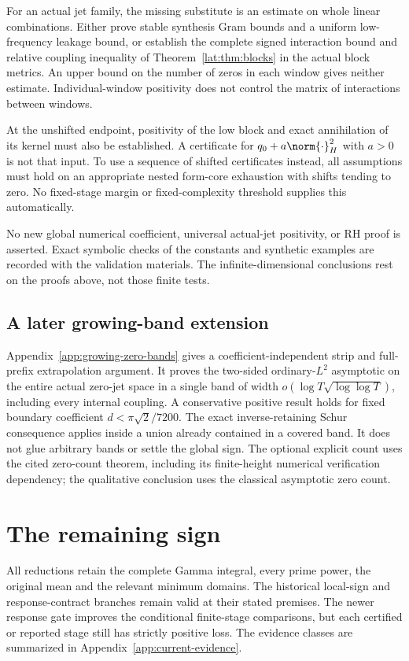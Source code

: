 \documentclass[11pt,a4paper]{article}
\numberwithin{equation}{section}
\theoremstyle{definition}\newtheorem{definition}[theorem]{Definition}
\theoremstyle{remark}\newtheorem{remark}[theorem]{Remark}
\begin{document}
For an actual jet family, the missing substitute is an estimate on whole
linear combinations. Either prove stable synthesis Gram bounds and a
uniform low-frequency leakage bound, or establish the complete signed
interaction bound and relative coupling inequality of
Theorem~\ref{lat:thm:blocks} in the actual block metrics. An upper bound on the
number of zeros in each window gives neither estimate. Individual-window
positivity does not control the matrix of interactions between windows.

At the unshifted endpoint, positivity of the low block and exact
annihilation of its kernel must also be established. A certificate for
$q_0+a\norm{\cdot}_H^2$ with $a>0$ is not that input. To use a sequence of
shifted certificates instead, all assumptions must hold on an appropriate
nested form-core exhaustion with shifts tending to zero. No fixed-stage
margin or fixed-complexity threshold supplies this automatically.

No new global numerical coefficient, universal actual-jet positivity,
or RH proof is asserted. Exact symbolic checks of the constants and synthetic examples are recorded with the validation materials. The infinite-dimensional conclusions rest on the proofs above, not those finite tests.


\subsection{A later growing-band extension}
Appendix~\ref{app:growing-zero-bands} gives a coefficient-independent
strip and full-prefix extrapolation argument. It proves the two-sided
ordinary-$L^2$ asymptotic on the entire actual zero-jet space in a single
band of width $o(\log T\sqrt{\log\log T})$, including every internal
coupling. A conservative positive result holds for fixed boundary coefficient
$d<\pi\sqrt2/7200$. The exact inverse-retaining Schur consequence applies
inside a union already contained in a covered band. It does not glue
arbitrary bands or settle the global sign. The optional explicit count uses
the cited zero-count theorem, including its finite-height numerical
verification dependency; the qualitative conclusion uses the classical
asymptotic zero count.

\section{The remaining sign}\label{sec:remaining}
All reductions retain the complete Gamma integral, every prime power, the original mean and the relevant minimum domains. The historical local-sign and response-contract branches remain valid at their stated premises. The newer response gate improves the conditional finite-stage comparisons, but each certified or reported stage still has strictly positive loss. The evidence classes are summarized in Appendix~\ref{app:current-evidence}.
\end{document}
